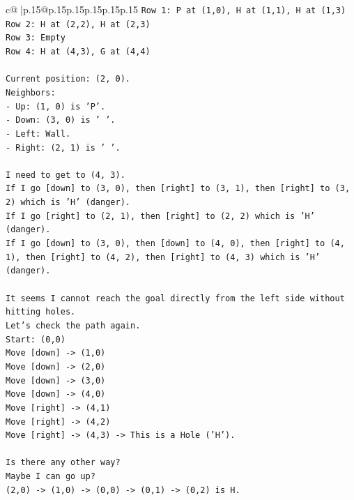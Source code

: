 \documentclass{article}
\begin{document}
{\begin{supertabular}{c@{$\;$}|p{.15\linewidth}@{}p{.15\linewidth}p{.15\linewidth}p{.15\linewidth}p{.15\linewidth}p{.15\linewidth}}
{{{\texttt{Row 1: P at (1,0), H at (1,1), H at (1,3)} \\
\texttt{Row 2: H at (2,2), H at (2,3)} \\
\texttt{Row 3: Empty} \\
\texttt{Row 4: H at (4,3), G at (4,4)} \\
\\ 
\texttt{Current position: (2, 0).} \\
\texttt{Neighbors:} \\
\texttt{{-} Up: (1, 0) is 'P'.} \\
\texttt{{-} Down: (3, 0) is ' '.} \\
\texttt{{-} Left: Wall.} \\
\texttt{{-} Right: (2, 1) is ' '.} \\
\\ 
\texttt{I need to get to (4, 3).} \\
\texttt{If I go {[}down{]} to (3, 0), then {[}right{]} to (3, 1), then {[}right{]} to (3, 2) which is 'H' (danger).} \\
\texttt{If I go {[}right{]} to (2, 1), then {[}right{]} to (2, 2) which is 'H' (danger).} \\
\texttt{If I go {[}down{]} to (3, 0), then {[}down{]} to (4, 0), then {[}right{]} to (4, 1), then {[}right{]} to (4, 2), then {[}right{]} to (4, 3) which is 'H' (danger).} \\
\\ 
\texttt{It seems I cannot reach the goal directly from the left side without hitting holes.} \\
\texttt{Let's check the path again.} \\
\texttt{Start: (0,0)} \\
\texttt{Move {[}down{]} {-}> (1,0)} \\
\texttt{Move {[}down{]} {-}> (2,0)} \\
\texttt{Move {[}down{]} {-}> (3,0)} \\
\texttt{Move {[}down{]} {-}> (4,0)} \\
\texttt{Move {[}right{]} {-}> (4,1)} \\
\texttt{Move {[}right{]} {-}> (4,2)} \\
\texttt{Move {[}right{]} {-}> (4,3) {-}> This is a Hole ('H').} \\
\\ 
\texttt{Is there any other way?} \\
\texttt{Maybe I can go up?} \\
\texttt{(2,0) {-}> (1,0) {-}> (0,0) {-}> (0,1) {-}> (0,2) is H.} \\
}}}
\end{supertabular}}
\end{document}
